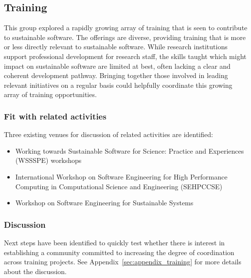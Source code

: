 \subsection{Training}


This group explored a rapidly growing array of training that is seen to
contribute to sustainable software. The offerings are diverse, providing
training that is more or less directly relevant to sustainable software. While
research institutions support professional development for research staff, the
skills taught which might impact on sustainable software are limited at best,
often lacking a clear and coherent development pathway. Bringing together those
involved in leading relevant initiatives on a regular basis could helpfully
coordinate this growing array of training opportunities.

\subsubsection{Fit with related activities} Three existing venues for discussion
of related activities are identified:

\begin{itemize}

\item Working towards Sustainable Software for Science: Practice and
Experiences (WSSSPE) workshops~\cite{WSSSPE}

\item International Workshop on Software Engineering for High
Performance Computing in Computational Science and
Engineering (SEHPCCSE)~\cite{SEHPCCSE}

\item Workshop on Software Engineering for Sustainable Systems~\cite{se4susy}

\end{itemize}

\subsubsection{Discussion}

Next steps have been identified to quickly test whether there is interest in
establishing a community committed to increasing the degree of coordination
across training projects. See Appendix~\ref{sec:appendix_training} for more details about the discussion.

